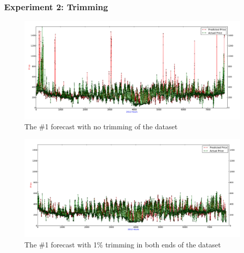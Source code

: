 \subsubsection{Experiment 2: Trimming}
\begin{figure}[H]
\centering
\includegraphics[width=0.85\linewidth,natwidth=898,natheight=587]{billeder/PriceExperimentalAnalysis/NoTrimming.jpg}
\caption{The \#1 forecast with no trimming of the dataset}
\label{fig:NoTrim}
\end{figure}

\begin{figure}[H]
\centering
\includegraphics[width=0.85\linewidth,natwidth=898,natheight=587]{billeder/PriceExperimentalAnalysis/1PTrim.jpg}
\caption{The \#1 forecast with 1\% trimming in both ends of the dataset}
\label{fig:1PTrim}
\end{figure}

